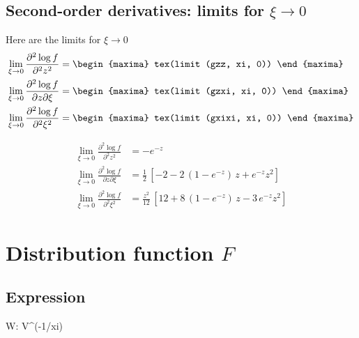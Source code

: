 \subsection{Second-order derivatives: limits for $\xi \to 0$}
Here are the limits for $\xi \to 0$
{\color{MonVertF}
  \begin{align*}
  \lim_{\xi \to 0} \frac{\partial^2 \log f}{\partial^2 z^2}
  &=
    \begin{maxima}
      tex(limit (gzz, xi, 0))
    \end{maxima}
  \\
  \lim_{\xi \to 0} \frac{\partial^2 \log f}{\partial z \partial \xi}
  &=
    \begin{maxima}
      tex(limit (gzxi, xi, 0))
    \end{maxima}
  \\
  \lim_{\xi \to 0} \frac{\partial^2 \log f}{\partial^2 \xi^2}
   &=
    \begin{maxima}
      tex(limit (gxixi, xi, 0))
    \end{maxima}
\end{align*}
}

{\color{red}
\begin{align*}
  \lim_{\xi \to 0} \frac{\partial^2 \log f}{\partial^2 z^2}
  &= -e^{-z}
  \\
  \lim_{\xi \to 0} \frac{\partial^2 \log f}{\partial z \partial \xi}
  &= \frac{1}{2} \, \left[ -2  - 2 \,(1 - e^{-z}) \, z  + e^{-z} z^2\right]  
  \\
  \lim_{\xi \to 0} \frac{\partial^2 \log f}{\partial^2 \xi^2}
   &=
    \frac{z^2}{12} \, \left[12 + 8 \, (1 - e^{-z}) \, z -3 \,e^{-z} z^2 \right]
\end{align*}}

\section{Distribution function $F$}

\subsection{Expression}

\begin{maxima}
  W: V^(-1/xi)
\end{maxima}

